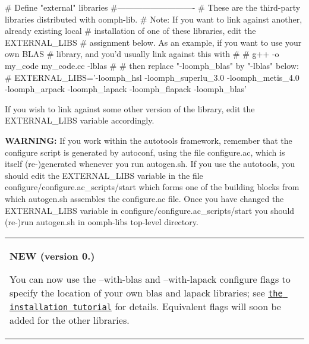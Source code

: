 \begin{DoxyCode}
\textcolor{preprocessor}{# Define "external" libraries}
\textcolor{preprocessor}{#----------------------------}
\textcolor{preprocessor}{# These are the third-party libraries distributed with oomph-lib.}
\textcolor{preprocessor}{# Note: If you want to link against another, already existing local}
\textcolor{preprocessor}{# installation of one of these libraries, edit the EXTERNAL\_LIBS}
\textcolor{preprocessor}{# assignment below. As an example, if you want to use your own BLAS}
\textcolor{preprocessor}{# library, and you'd usually link against this with}
\textcolor{preprocessor}{#}
\textcolor{preprocessor}{#    g++ -o my\_code my\_code.cc -lblas}
\textcolor{preprocessor}{#}
\textcolor{preprocessor}{# then replace "-loomph\_blas" by "-lblas" below:}
\textcolor{preprocessor}{#}
\textcolor{preprocessor}{EXTERNAL\_LIBS='-loomph\_hsl -loomph\_superlu\_3.0 -loomph\_metis\_4.0 -loomph\_arpack -loomph\_lapack
       -loomph\_flapack -loomph\_blas'}
\end{DoxyCode}


If you wish to link against some other version of the library, edit the {\ttfamily E\+X\+T\+E\+R\+N\+A\+L\+\_\+\+L\+I\+BS} variable accordingly.

{\bfseries W\+A\+R\+N\+I\+NG\+:} If you work within the autotools framework, remember that the {\ttfamily configure} script is generated by {\ttfamily autoconf}, using the file {\ttfamily  configure.\+ac}, which is itself (re-\/)generated whenever you run {\ttfamily autogen.\+sh}. If you use the autotools, you should edit the {\ttfamily E\+X\+T\+E\+R\+N\+A\+L\+\_\+\+L\+I\+BS} variable in the file {\ttfamily configure/configure.\+ac\+\_\+scripts/start} which forms one of the building blocks from which {\ttfamily  autogen.\+sh }assembles the {\ttfamily configure.\+ac } file. Once you have changed the {\ttfamily E\+X\+T\+E\+R\+N\+A\+L\+\_\+\+L\+I\+BS} variable in {\ttfamily configure/configure.\+ac\+\_\+scripts/start} you should (re-\/)run {\ttfamily autogen.\+sh} in {\ttfamily oomph-\/lib\textquotesingle{}s} top-\/level directory.

\begin{center} \tabulinesep=1mm
\begin{longtabu} spread 0pt [c]{*{1}{|X[-1]}|}
\hline
\begin{center} {\bfseries N\+EW (version 0.)} \end{center}  You can now use the {\ttfamily --with-\/blas} and {\ttfamily --with-\/lapack} configure flags to specify the location of your own blas and lapack libraries; see \href{../../the_distribution/html/index.html#external_src}{\tt the installation tutorial} for details. Equivalent flags will soon be added for the other libraries.   \\
\end{longtabu}
\end{center} 




